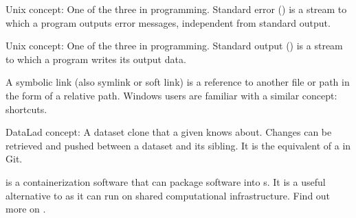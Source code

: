 \begin{description}
\ignorespaces 
\sphinxAtStartPar
Unix concept: One of the three 
in programming. Standard error () is a stream to which a program
outputs error messages, independent from standard output.

\ignorespaces 
\sphinxAtStartPar
Unix concept: One of the three 
in programming. Standard output () is a stream to which a program
writes its output data.

\ignorespaces 
\sphinxAtStartPar
A symbolic link (also symlink or soft link) is a reference to another file or path in the form
of a relative path. Windows users are familiar with a similar concept: shortcuts.

\sphinxAtStartPar
DataLad concept: A dataset clone that a given {\hyperref[\detokenize{glossary:term-DataLad-dataset}]{}} knows about. Changes can be
retrieved and pushed between a dataset and its sibling. It is the
equivalent of a {\hyperref[\detokenize{glossary:term-remote}]{}} in Git.

\sphinxAtStartPar
{} is a containerization software that can package software into {\hyperref[\detokenize{glossary:term-software-container}]{}}s.
It is a useful alternative to {\hyperref[\detokenize{glossary:term-Docker}]{}} as it can run on shared computational infrastructure.
Find out more on .


\end{description}
